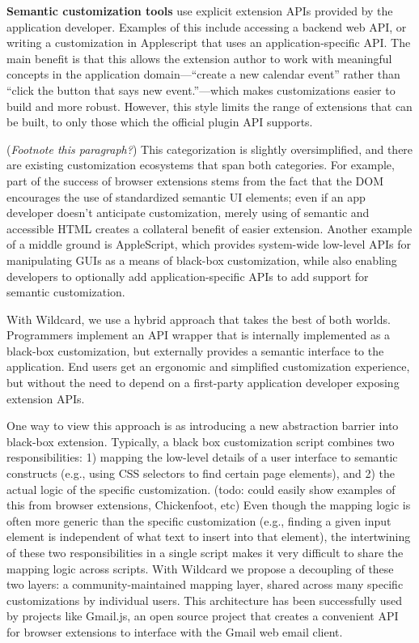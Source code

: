 \documentclass[sigplan,10pt,anonymous,review]{acmart}
\begin{document}
\textbf{Semantic customization tools} use explicit extension APIs
provided by the application developer. Examples of this include
accessing a backend web API, or writing a customization in Applescript
that uses an application-specific API. The main benefit is that this
allows the extension author to work with meaningful concepts in the
application domain---``create a new calendar event'' rather than ``click
the button that says new event.''---which makes customizations easier to
build and more robust. However, this style limits the range of
extensions that can be built, to only those which the official plugin
API supports.

(\emph{Footnote this paragraph?}) This categorization is slightly
oversimplified, and there are existing customization ecosystems that
span both categories. For example, part of the success of browser
extensions stems from the fact that the DOM encourages the use of
standardized semantic UI elements; even if an app developer doesn't
anticipate customization, merely using of semantic and accessible HTML
creates a collateral benefit of easier extension. Another example of a
middle ground is AppleScript, which provides system-wide low-level APIs
for manipulating GUIs as a means of black-box customization, while also
enabling developers to optionally add application-specific APIs to add
support for semantic customization.

With Wildcard, we use a hybrid approach that takes the best of both
worlds. Programmers implement an API wrapper that is internally
implemented as a black-box customization, but externally provides a
semantic interface to the application. End users get an ergonomic and
simplified customization experience, but without the need to depend on a
first-party application developer exposing extension APIs.

One way to view this approach is as introducing a new abstraction
barrier into black-box extension. Typically, a black box customization
script combines two responsibilities: 1) mapping the low-level details
of a user interface to semantic constructs (e.g., using CSS selectors to
find certain page elements), and 2) the actual logic of the specific
customization. (todo: could easily show examples of this from browser
extensions, Chickenfoot, etc) Even though the mapping logic is often
more generic than the specific customization (e.g., finding a given
input element is independent of what text to insert into that element),
the intertwining of these two responsibilities in a single script makes
it very difficult to share the mapping logic across scripts. With
Wildcard we propose a decoupling of these two layers: a
community-maintained mapping layer, shared across many specific
customizations by individual users. This architecture has been
successfully used by projects like Gmail.js, an open source project that
creates a convenient API for browser extensions to interface with the
Gmail web email client.
\end{document}
